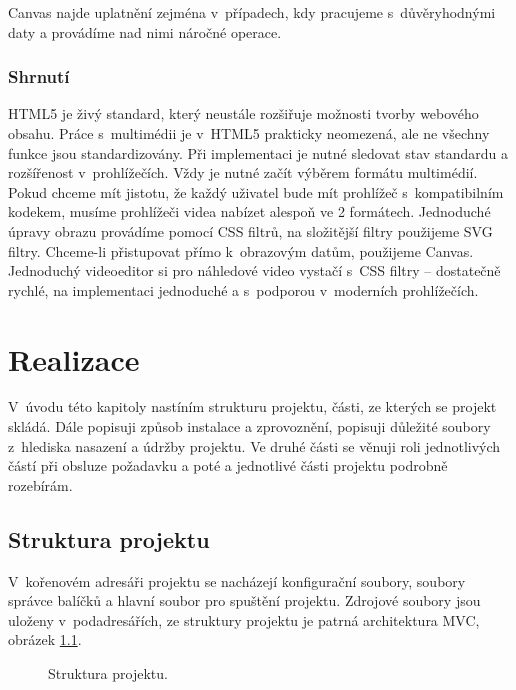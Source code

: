 Canvas najde uplatnění zejména v~případech, kdy pracujeme s~důvěryhodnými daty a provádíme nad nimi náročné operace. 

\subsection{Shrnutí}
HTML5 je živý standard, který neustále rozšiřuje možnosti tvorby webového obsahu. Práce s~multimédii je v~HTML5 prakticky neomezená, ale ne všechny funkce jsou standardizovány. Při implementaci je nutné sledovat stav standardu a rozšířenost v~prohlížečích. Vždy je nutné začít výběrem formátu multimédií. Pokud chceme mít jistotu, že každý uživatel bude mít prohlížeč s~kompatibilním kodekem, musíme prohlížeči videa nabízet alespoň ve 2 formátech. Jednoduché úpravy obrazu provádíme pomocí CSS filtrů, na složitější filtry použijeme SVG filtry. Chceme-li přistupovat přímo k~obrazovým datům, použijeme Canvas. Jednoduchý videoeditor si pro náhledové video vystačí s~CSS filtry -- dostatečně rychlé, na implementaci jednoduché a s~podporou v~moderních prohlížečích.

\chapter{Realizace}
V~úvodu této kapitoly nastíním strukturu projektu, části, ze kterých se projekt skládá. Dále popisuji způsob instalace a zprovoznění, popisuji důležité soubory z~hlediska nasazení a údržby projektu. Ve druhé části se věnuji roli jednotlivých částí při obsluze požadavku a poté a jednotlivé části projektu podrobně rozebírám.

\section{Struktura projektu}
V~kořenovém adresáři projektu se nacházejí konfigurační soubory, soubory správce balíčků a hlavní soubor pro spuštění projektu. Zdrojové soubory jsou uloženy v~podadresářích, ze struktury projektu je patrná architektura MVC, obrázek \ref{img:structure}.
\begin{figure}[h]
	\centering
	\caption{Struktura projektu.}\label{img:structure}
\end{figure}

